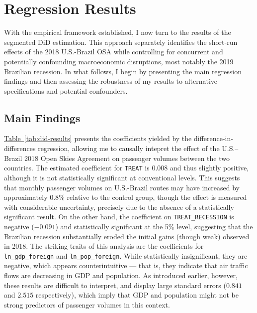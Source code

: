\documentclass[12pt]{article}
\begin{document}
\section{Regression Results}
With the empirical framework established, I now turn to the results of the segmented DiD estimation. This approach separately identifies the short-run effects of the 2018 U.S.-Brazil OSA while controlling for concurrent and potentially confounding macroeconomic disruptions, most notably the 2019 Brazilian recession. In what follows, I begin by presenting the main regression findings and then assessing the robustness of my results to alternative specifications and potential confounders.

\subsection{Main Findings}
\hyperref[tab:did-results]{Table~\ref*{tab:did-results}} presents the coefficients yielded by the difference-in-differences regression, allowing me to causally intepret the effect of the U.S.–Brazil 2018 Open Skies Agreement on passenger volumes between the two countries. 
The estimated coefficient for \texttt{TREAT} is $0.008$ and thus slightly positive, although it is not statistically significant at conventional levels. This suggests that monthly passenger volumes on U.S.-Brazil routes may have increased by approximately 0.8\% relative to the control group, though the effect is measured with considerable uncertainty, precisely due to the absence of a statistically significant result.  On the other hand, the coefficient on \texttt{TREAT\_RECESSION} is negative ($-0.091$) and statistically significant at the 5\% level, suggesting that the Brazilian recession substantially eroded the initial gains (though weak) observed in 2018. The striking traits of this analysis are the coefficients for \texttt{ln\_gdp\_foreign} and \texttt{ln\_pop\_foreign}. While statistically insignificant, they are negative, which appears counterintuitive --- that is, they indicate that air traffic flows are decreasing in GDP and population. As introduced earlier, however, these results are difficult to interpret, and display large standard errors ($0.841$ and $2.515$ respectively), which imply that GDP and population might not be strong predictors of passenger volumes in this context. 
\end{document}
